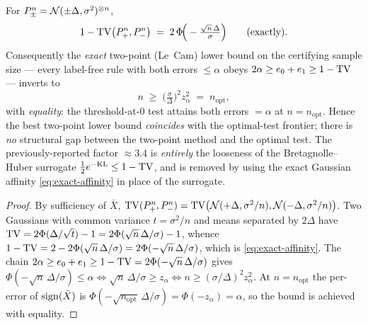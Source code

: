 \begin{proposition}\label{prop:t1a}
For $P^n_\pm=\mathcal N(\pm\Delta,\sigma^2)^{\otimes n}$,
\begin{equation}\label{eq:exact-affinity}
   1-\mathrm{TV}\big(P^n_+,P^n_-\big)\;=\;2\,\Phi\!\Big(-\tfrac{\sqrt n\,\Delta}{\sigma}\Big)
   \qquad\text{(exactly).}
\end{equation}
Consequently the \emph{exact} two-point (Le~Cam) lower bound on the certifying sample size ---
every label-free rule with both errors $\le\alpha$ obeys $2\alpha\ge e_0+e_1\ge 1-\mathrm{TV}$ ---
inverts to
\[
   n\;\ge\;\Big(\tfrac{\sigma}{\Delta}\Big)^2 z_\alpha^2\;=\;n_{\mathrm{opt}},
\]
with \emph{equality}: the threshold-at-$0$ test attains both errors $=\alpha$ at
$n=n_{\mathrm{opt}}$. Hence the best two-point lower bound \emph{coincides} with the
optimal-test frontier; there is \emph{no} structural gap between the two-point method and the
optimal test. The previously-reported factor $\approx 3.4$ is \emph{entirely} the looseness of
the Bretagnolle--Huber surrogate $\tfrac12 e^{-\mathrm{KL}}\le 1-\mathrm{TV}$, and is removed by using the
exact Gaussian affinity \eqref{eq:exact-affinity} in place of the surrogate.
\end{proposition}

\begin{proof}
By sufficiency of $\bar X$, $\mathrm{TV}(P^n_+,P^n_-)=\mathrm{TV}\big(\mathcal N(+\Delta,\sigma^2/n),
\mathcal N(-\Delta,\sigma^2/n)\big)$. Two Gaussians with common variance $t=\sigma^2/n$ and means
separated by $2\Delta$ have $\mathrm{TV}=2\Phi(\Delta/\sqrt t)-1=2\Phi(\sqrt n\,\Delta/\sigma)-1$,
whence $1-\mathrm{TV}=2-2\Phi(\sqrt n\,\Delta/\sigma)=2\Phi(-\sqrt n\,\Delta/\sigma)$, which is
\eqref{eq:exact-affinity}. The chain $2\alpha\ge e_0+e_1\ge 1-\mathrm{TV}=2\Phi(-\sqrt n\,\Delta/\sigma)$
gives $\Phi(-\sqrt n\,\Delta/\sigma)\le\alpha\iff\sqrt n\,\Delta/\sigma\ge z_\alpha\iff
n\ge(\sigma/\Delta)^2z_\alpha^2$. At $n=n_{\mathrm{opt}}$ the per-error of $\operatorname{sign}(\bar X)$ is
$\Phi(-\sqrt{n_{\mathrm{opt}}}\,\Delta/\sigma)=\Phi(-z_\alpha)=\alpha$, so the bound is achieved
with equality.
\end{proof}

